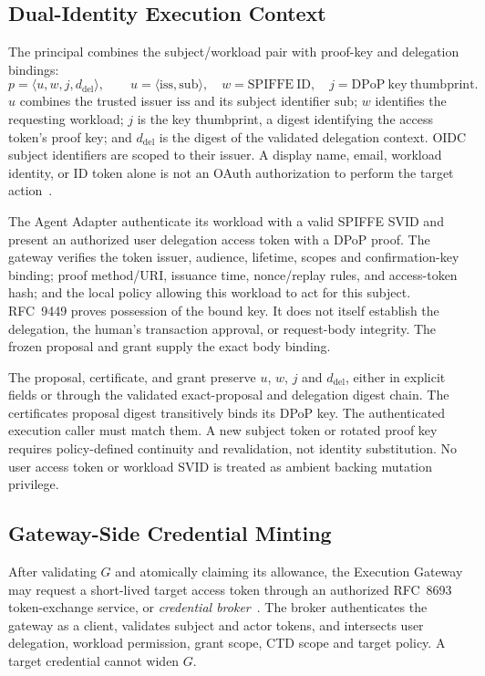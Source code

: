 \subsection{Dual-Identity Execution Context}
\label{sec:dual-identity}
The principal combines the subject/workload pair with proof-key and delegation bindings:
\begin{equation}
p=\langle u,w,j,d_{\mathrm{del}}\rangle,\qquad
u=\langle \mathrm{iss},\mathrm{sub}\rangle,\quad
w=\mathrm{SPIFFE\ ID},\quad j=\mathrm{DPoP\ key\ thumbprint}.
\end{equation}
$u$ combines the trusted issuer $\mathrm{iss}$ and its subject identifier $\mathrm{sub}$; $w$ identifies the requesting workload; $j$ is the key thumbprint, a digest identifying the access token's proof key; and $d_{\mathrm{del}}$ is the digest of the validated delegation context. OIDC subject identifiers are scoped to their issuer. A display name, email, workload identity, or ID token alone is not an OAuth authorization to perform the target action~\cite{oidccore,spiffe2026,rfc9449}.

The Agent Adapter  authenticate its workload with a valid SPIFFE SVID and present an authorized user delegation access token with a DPoP proof. The gateway verifies the token issuer, audience, lifetime, scopes and confirmation-key binding; proof method/URI, issuance time, nonce/replay rules, and access-token hash; and the local policy allowing this workload to act for this subject. RFC~9449 proves possession of the bound key. It does not itself establish the delegation, the human's transaction approval, or request-body integrity. The frozen proposal and grant supply the exact body binding.

The proposal, certificate, and grant  preserve $u$, $w$, $j$ and $d_{\mathrm{del}}$, either in explicit fields or through the validated exact-proposal and delegation digest chain. The certificate\textquotesingle s proposal digest transitively binds its DPoP key. The authenticated execution caller must match them. A new subject token or rotated proof key requires policy-defined continuity and revalidation, not identity substitution. No user access token or workload SVID is treated as ambient backing mutation privilege.

\subsection{Gateway-Side Credential Minting}
\label{sec:token-exchange}
After validating $G$ and atomically claiming its allowance, the Execution Gateway may request a short-lived target access token through an authorized RFC~8693 token-exchange service, or \emph{credential broker}~\cite{rfc8693}. The broker authenticates the gateway as a client, validates subject and actor tokens, and intersects user delegation, workload permission, grant scope, CTD scope and target policy. A target credential cannot widen $G$.

